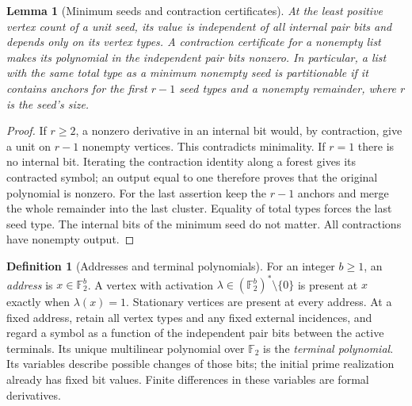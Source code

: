 \documentclass[11pt]{article}
\newtheorem{lemma}[theorem]{Lemma}
\theoremstyle{definition}
\newtheorem{definition}[theorem]{Definition}
\theoremstyle{remark}
\newcommand{\F}{\mathbb F}
\begin{document}
\begin{lemma}[Minimum seeds and contraction certificates]\label{ex:sec7-seed-certificate}
At the least positive vertex count of a unit seed, its value is
independent of all internal pair bits and depends only on its vertex
types. A contraction certificate for a nonempty list makes its
polynomial in the independent pair bits nonzero. In particular, a
list with the same total type as a minimum nonempty seed is
partitionable if it contains anchors for the first $r-1$ seed types
and a nonempty remainder, where $r$ is the seed's size.
\end{lemma}
\begin{proof}\leavevmode
If $r\ge2$, a nonzero derivative in an internal bit would, by
contraction, give a unit on $r-1$ nonempty vertices. This contradicts
minimality. If $r=1$ there is no internal bit. Iterating the contraction
identity along a forest gives its contracted symbol; an output equal
to one therefore proves that the original polynomial is nonzero.
For the last assertion keep the $r-1$ anchors and merge the whole
remainder into the last cluster. Equality of total types forces the
last seed type. The internal bits of the minimum seed do not matter.
All contractions have nonempty output.
\end{proof}

\begin{definition}[Addresses and terminal polynomials]\label{ex:sec7-address}
For an integer $b\ge1$, an \emph{address} is $x\in\F_2^b$.
A vertex with activation $\lambda\in(\F_2^b)^*\setminus\{0\}$ is
present at $x$ exactly when $\lambda(x)=1$. Stationary vertices are
present at every address. At a fixed address, retain all vertex
types and any fixed external incidences, and regard a symbol as a
function of the independent pair bits between the active terminals.
Its unique multilinear polynomial over $\F_2$ is the
\emph{terminal polynomial}. Its variables describe possible changes
of those bits; the initial prime realization already has fixed bit
values. Finite differences in these variables are formal derivatives.
\end{definition}
\end{document}
